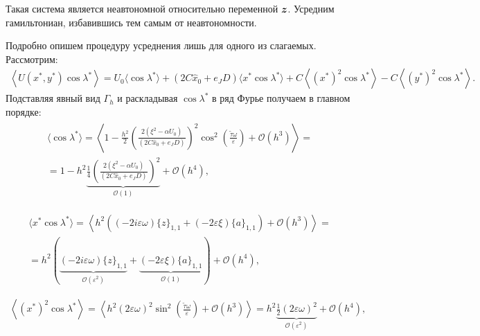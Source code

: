 Такая система является неавтономной относительно переменной $\boldsymbol{z}$. Усредним гамильтониан, избавившись тем самым от неавтономности.

Подробно опишем процедуру усреднения лишь для одного из слагаемых. Рассмотрим:
\begin{equation*}
\begin{aligned}
\left\langle U(x^*, y^*) \cos \lambda^* \right\rangle = U_0 \langle \cos \lambda^* \rangle + (2C \hat x_0 + e_J D) \langle x^* \cos \lambda^* \rangle + C \left\langle (x^*)^2 \cos \lambda^* \right\rangle - C \left\langle (y^*)^2 \cos \lambda^* \right\rangle.
\end{aligned}
\end{equation*}
Подставляя явный вид $\Gamma_h$ и раскладывая $\cos \lambda^*$ в ряд Фурье получаем в главном порядке:
\begin{multline*}
\begin{aligned}
\langle \cos \lambda^* \rangle = \left\langle 1 - \frac{h^2}{2}\left( \frac{2(\xi^2-\alpha U_0)}{(2C \hat x_0 + e_J D)} \right)^2 \cos^2 \left( \frac{\tilde \tau \omega}{\varepsilon} \right) + \mathcal{O}(h^3) \right\rangle = \\ = 1 - h^2 \underbrace{\frac{1}{4}\left( \frac{2(\xi^2-\alpha U_0)}{(2C \hat x_0 + e_J D)} \right)^2}_{\mathcal{O}(1)} + \mathcal{O}(h^4),
\end{aligned}
\end{multline*}

\begin{equation*}
\begin{aligned}
\langle x^* \cos \lambda^* \rangle = \left\langle h^2 \left( (-2i \varepsilon \omega) \{z\}_{1,1} + (-2 \varepsilon \xi) \{a\}_{1,1} \right) + \mathcal{O}(h^3) \right\rangle = \\ = h^2 \left( \underbrace{(-2i \varepsilon \omega) \{z\}_{1,1}}_{\mathcal{O}(\varepsilon^2)} + \underbrace{(-2 \varepsilon \xi) \{a\}_{1,1}}_{\mathcal{O}(1)} \right) + \mathcal{O}(h^4),
\end{aligned}
\end{equation*}

\begin{equation*}
\begin{aligned}
\left\langle (x^*)^2 \cos \lambda^* \right\rangle = \left\langle h^2 (2 \varepsilon \omega)^2 \sin^2 \left( \frac{\tilde \tau \omega}{\varepsilon} \right) + \mathcal{O}(h^3) \right\rangle = h^2 \underbrace{\frac12 (2 \varepsilon \omega)^2}_{\mathcal{O}(\varepsilon^2)} + \mathcal{O}(h^4),
\end{aligned}
\end{equation*}

